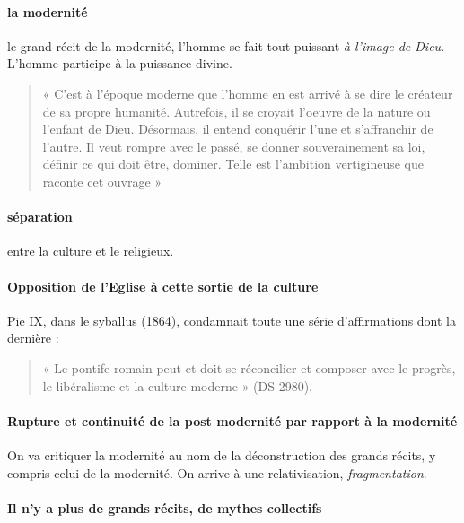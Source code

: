 \paragraph{la modernité} le grand récit de la modernité, l'homme se fait tout puissant \textit{à l'image de Dieu}. L'homme participe à la puissance divine.

 
   \begin{quote}
    « C’est à l’époque moderne que l’homme en est arrivé à se dire le créateur de sa propre
humanité. Autrefois, il se croyait l’oeuvre de la nature ou l’enfant de Dieu. Désormais, il
entend conquérir l’une et s’affranchir de l’autre. Il veut rompre avec le passé, se donner
souverainement sa loi, définir ce qui doit être, dominer. Telle est l’ambition vertigineuse que
raconte cet ouvrage »
\end{quote} 
 
\paragraph{séparation} entre la culture et le religieux. 

\paragraph{Opposition de l'Eglise à cette sortie de la culture}
    Pie IX, dans le syballus (1864), condamnait toute une série d’affirmations dont la dernière :
\begin{quote}

« Le pontife romain peut et doit se réconcilier et composer avec le progrès, le libéralisme et la
culture moderne » (DS 2980). 
\end{quote}


\paragraph{Rupture et continuité de la post modernité par rapport à la modernité} On va critiquer la modernité au nom de la déconstruction des grands récits, y compris celui de la modernité. On arrive à une relativisation, \textit{fragmentation}. 

\paragraph{Il n'y a plus de grands récits, de mythes collectifs}

